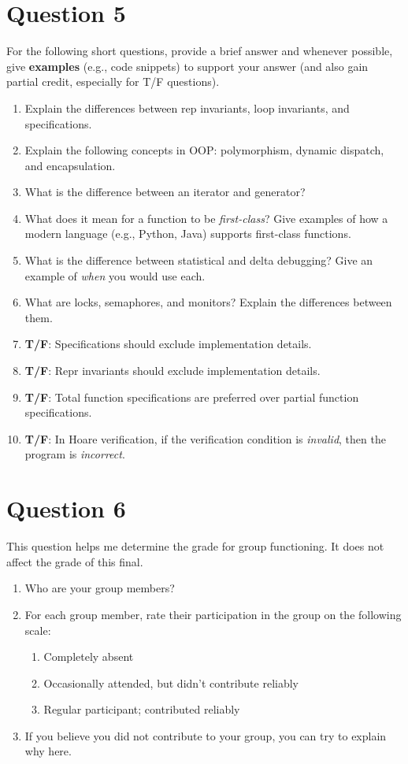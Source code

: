 \documentclass[10pt]{article}
\begin{document}
\newpage
\section{Question 5}

For the following short questions, provide a brief answer and whenever possible, give \textbf{examples} (e.g., code snippets) to support your answer (and also gain partial credit, especially for T/F questions).
\begin{enumerate} 
\item Explain the differences between rep invariants, loop invariants, and specifications.
\item Explain the following concepts in OOP: polymorphism, dynamic dispatch, and encapsulation.
\item  What is the difference between an iterator and generator?
\item What does it mean for a function to be \emph{first-class}? Give examples of how a modern language (e.g., Python, Java) supports first-class functions.
\item What is the difference between statistical and delta debugging?  Give an example of \emph{when} you would use each.
\item What are locks, semaphores, and monitors?  Explain the differences between them.
\item \textbf{T/F}: Specifications should exclude implementation details.
\item \textbf{T/F}: Repr invariants should exclude implementation details.
\item \textbf{T/F}: Total function specifications are preferred over partial function specifications.
\item \textbf{T/F}: In Hoare verification, if the verification condition is \emph{invalid}, then the program is \emph{incorrect}.
\end{enumerate}


\newpage
\section{Question 6}

This question helps me determine the grade for group functioning.  It does not affect the grade of this final.

\begin{enumerate}
\item Who are your group members?
\item For each group member, rate their participation in the group on the following scale:
  \begin{enumerate}
  \item Completely absent
  \item Occasionally attended, but didn't contribute reliably
  \item Regular participant; contributed reliably
  \end{enumerate}
\item If you believe you did not contribute to your group, you can try to explain why here.
\end{enumerate}
\end{document}
